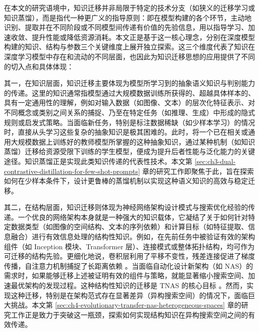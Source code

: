 \documentclass[../main.tex]{subfiles}
\begin{document}
在本文的研究语境中，知识迁移并非局限于特定的技术分支（如狭义的迁移学习或知识蒸馏），而是指代一种更广义的指导原则：即在模型构建的各个环节，主动地识别、提取并在不同阶段或不同模型间传递有价值的先验信息，用以指导学习、加速收敛、提升性能或降低资源消耗。本文正是基于这一核心理念，分别在深度模型构建的知识、结构与参数三个关键维度上展开独立探索。这三个维度代表了知识在深度学习模型中存在和流动的不同层面，也因此为知识迁移思想的应用提供了不同的切入点和具体体现：

其一，在知识层面，知识迁移主要体现为模型所学习到的抽象语义知识与判别能力的传递。这里的知识通常指模型通过大规模数据训练所获得的、超越具体样本的、具有一定通用性的理解，例如对输入数据（如图像、文本）的层次化特征表示、对不同概念或类别之间关系的捕捉、乃至在特定任务（如推理、生成）中形成的隐式规则或启发式策略。当面临新任务，特别是标注数据稀缺（如少样本学习）的情况时，直接从头学习这些复杂的抽象知识是极其困难的。此时，将一个已在相关或通用大规模数据上训练好的教师模型所掌握的这种抽象知识，通过某种机制（如知识蒸馏）迁移给资源受限下训练的学生模型，便成为提升后者性能与泛化能力的关键途径。知识蒸馏正是实现此类知识传递的代表性技术\cite{modelcompression_bucilua_2006,distillingknowledgeneural_hinton_2015,fitnetshintsthin_romero_2015}。本文第 \ref{sec:ch3-dual-contrastive-distillation-for-few-shot-prompts} 章的研究工作即聚焦于此，旨在探索如何在少样本条件下，设计更鲁棒的蒸馏机制以实现这种语义知识的高效与稳定迁移。

其二，在结构层面，知识迁移则体现为神经网络架构设计模式与搜索优化经验的传递。一个优良的网络架构本身就是一种强大的知识载体，它凝结了关于如何针对特定数据类型（如图像的空间结构、文本的序列依赖）和计算目标（如特征提取、信息融合）进行有效信息处理的结构性知识。例如，在先前任务中被验证有效的架构组件（如 Inception 模块、Transformer 层）\cite{goingdeeperconvolutions_szegedy_2015,attentionisall_vaswani_2017}、连接模式或整体拓扑结构，均可作为可迁移的结构先验。更细化地说，卷积层利用了平移不变性，残差连接促进了梯度传播，自注意力机制捕捉了长距离依赖 \cite{imagenetclassificationdeep_krizhevsky_2012,deepresiduallearning_he_2016,attentionisall_vaswani_2017}。当面临自动化设计新架构（如 NAS）的需求时，如果能够迁移上述被证明有效的组件与策略，就能显著缩小搜索空间、加速最优架构的发现过程。这种结构性知识的迁移是 TNAS 的核心目标 \cite{archgraphacyclic_huang_2022,emtnastransferring_liao_2023}。然而，实现这种迁移，特别是在架构范式存在显著差异（异构搜索空间）的情况下，面临巨大挑战。本文第 \ref{sec:ch4-evolutionary-transfer-nas-heterogeneous-spaces} 章的研究工作正是致力于突破这一瓶颈，探索如何实现结构知识在异构搜索空间之间的有效传递。
\end{document}
